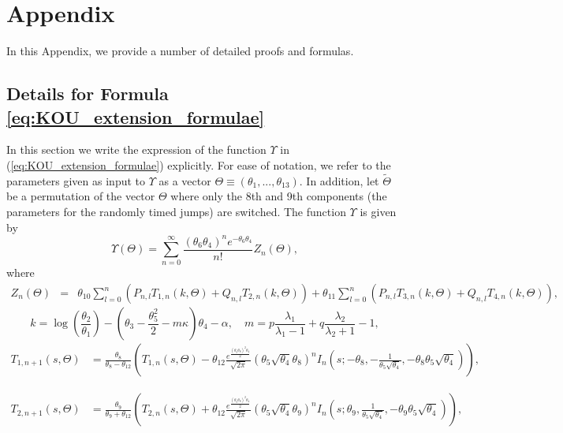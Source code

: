 \documentclass[11pt]{article}
\numberwithin{equation}{section}
\numberwithin{theorem}{section}
\begin{document}
 
\appendix
{}  
\section{Appendix}
In this Appendix, we provide a number of detailed proofs and formulas. 
\subsection{Details for Formula \eqref{eq:KOU_extension_formulae}}\label{sect-app1}
In this section we write the expression of the function $\Upsilon$ in (\ref{eq:KOU_extension_formulae}) explicitly. For ease of notation, we refer to the parameters given as input to $\Upsilon$ as a vector  $\Theta\equiv\left(\theta_1,...,\theta_{13}\right)$. In addition, let $\tilde{\Theta}$ be a permutation of the vector $\Theta$ where only the 8th and 9th components (the parameters for  the randomly timed jumps) are switched. The function $\Upsilon$ is given by 
\begin{equation}
\Upsilon(\Theta) = \sum_{n=0}^{\infty}\frac{\left(
\theta_6\theta_4\right)^{n}e^{-
\theta_6\theta_4}}{n!}Z_{n}\left(\Theta\right), \label{eq:upsilon}
\end{equation}
where 
\begin{eqnarray*}
Z_{n}\left(\Theta\right) & = & \theta_{10}\sum_{l=0}^{n}\left(P_{n,l}T_{1,n}\left(k,\Theta\right)+Q_{n,l}T_{2,n}\left(k,\Theta\right)\right)+\theta_{11}\sum_{l=0}^{n}\left(P_{n,l}T_{3,n}\left(k,\Theta\right)+Q_{n,l}T_{4,n}\left(k,\Theta\right)\right),
\end{eqnarray*}
 \[ k={\log}\left(\frac{\theta_2}{\theta_1}\right)-\left(\theta_3-\frac{\theta_5^{2}}{2}-m\kappa\right)\theta_4-\alpha,\quad m=p\frac{\lambda_{1}}{\lambda_{1}-1}+q\frac{\lambda_{2}}{\lambda_{2}+1}-1,\]
\begin{align*}
T_{1,n+1}\left(s,\Theta\right) & =\frac{\theta_{8}}{\theta_{8}-\theta_{12}}\left(T_{1,n}\left(s,\Theta\right)-\theta_{12}\frac{e^{\frac{\left(\theta_5\theta_{8}\right)^{2}\theta_4}{2}}}{\sqrt{2\pi}}\left(
\theta_5\sqrt{\theta_4}\theta_{8}\right)^{n}I_{n}\left(s;-\theta_{8},-\frac{1}{\theta_5\sqrt{\theta_4}},-\theta_{8}\theta_5\sqrt{\theta_4}\right)\right),
\end{align*}
 
\begin{align*}
T_{2,n+1}\left(s,\Theta\right) & =\frac{\theta_{9}}{\theta_{9}+\theta_{12}}\left(T_{2,n}\left(s,\Theta\right)+\theta_{12}\frac{e^{\frac{\left(\theta_5\theta_{8}\right)^{2}\theta_4}{2}}}{\sqrt{2\pi}}\left(
\theta_5\sqrt{\theta_4}\theta_{9}\right)^{n}I_{n}\left(s;\theta_{9},\frac{1}{\theta_5\sqrt{\theta_4}},-\theta_{9}\theta_5\sqrt{\theta_4}\right)\right),
\end{align*}
 
\end{document}
